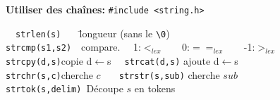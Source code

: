 \documentclass[a4paper,10pt,landscape]{article}
\begin{document}
\begin{minipage}{1.0\linewidth}
\begin{multicols}{3}
  \medskip
  \textbf{Utiliser des chaînes:} \verb=#include <string.h>= \vspace{-.6\baselineskip}
  \begin{tabbing}
    ~~\=\verb=strlen(s)   = \=longueur (sans le \verb=\0=)\\
    \>\verb=strcmp(s1,s2)=\>~~compare. ~~1:$<_{lex}$  ~~~0:$==_{lex}$ ~~~-1:$>_{lex}$\\
    \>\verb=strcpy(d,s)=\>copie d$\leftarrow$s \verb=  strcat(d,s)= ajoute d$\leftarrow$s\\
    \>\verb=strchr(s,c)=\>cherche $c$ \verb=   strstr(s,sub)= cherche $sub$\\
    \>\verb=strtok(s,delim) =Découpe $s$ en tokens
  \end{tabbing}
\end{multicols}  
\end{minipage}%
\begin{minipage}{.1\linewidth}  
\end{minipage}

\setlength\columnseprule{0pt}
\end{document}
